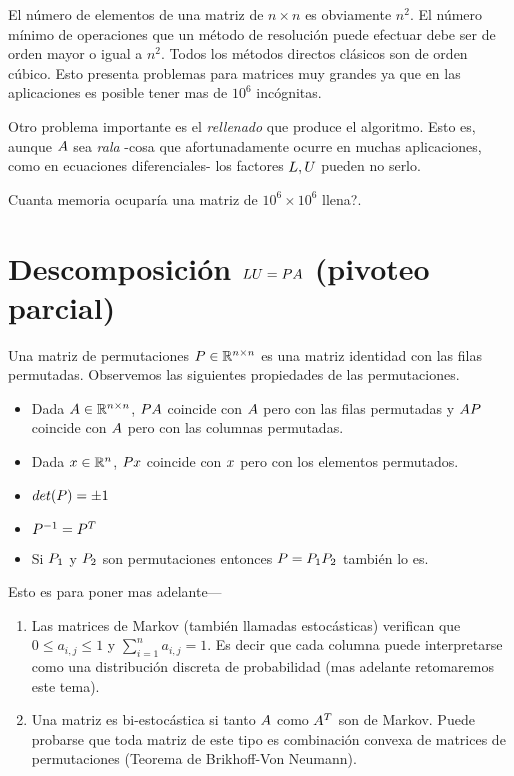 \begin{tcolorbox}
El número de elementos de una matriz de $n\times n$ es obviamente $n^2$. El número mínimo de operaciones que un método de resolución puede efectuar debe ser de orden mayor o igual a $n^2$. Todos los métodos directos clásicos son de orden cúbico. Esto presenta problemas para matrices muy grandes ya que en las aplicaciones es posible tener mas de $10^6$ incógnitas.

Otro problema importante es el \emph{rellenado} que produce el algoritmo. Esto es, aunque $\Ab$ sea \emph{rala} -cosa que afortunadamente ocurre en muchas aplicaciones, como en ecuaciones diferenciales- los factores $\Lb,\Ub$ pueden no serlo.

\begin{ej}
 Cuanta memoria ocuparía una matriz
 de $10^6\times 10^6$ llena?.
\end{ej}



\section{Descomposición $\Lb\Ub=\Pb\Ab$ (pivoteo parcial)}
Una matriz de permutaciones $\Pb\in \Rnn$
es una matriz identidad con las filas permutadas. Observemos las siguientes propiedades de las permutaciones.
\begin{itemize}
 \item Dada $\Ab\in \Rnn$, $\Pb\Ab$ coincide con $\Ab$ pero con las filas permutadas y $\Ab\Pb$ coincide con $\Ab$ pero con las columnas permutadas.
 \item Dada $\xb\in \Rn$, $\Pb\xb$ coincide con $\xb$ pero con los elementos permutados.
 \item $det(\Pb)=\pm 1$
 \item $\Pb^{-1}=\Pb^T$
 \item Si $\Pb_1$ y $\Pb_2$ son permutaciones entonces $\Pb=\Pb_1\Pb_2$ también lo es.
\end{itemize}
\begin{tcolorbox}
Esto es para poner mas adelante---
 \begin{rem}
 \begin{enumerate}
  \item Las matrices de Markov (también llamadas estocásticas) verifican que $0\le a_{i,j}\le 1$
  y $\sum_{i=1}^na_{i,j}=1$. Es decir que cada columna puede interpretarse como una distribución discreta de probabilidad (mas adelante retomaremos este tema).
  \item Una matriz es bi-estocástica si tanto $\Ab$ como $\Ab^T$ son de Markov. Puede probarse que toda matriz de este tipo es combinación convexa de matrices de permutaciones
  (Teorema de Brikhoff-Von Neumann).
 \end{enumerate}
 \end{rem}
\end{tcolorbox}



\end{tcolorbox}
